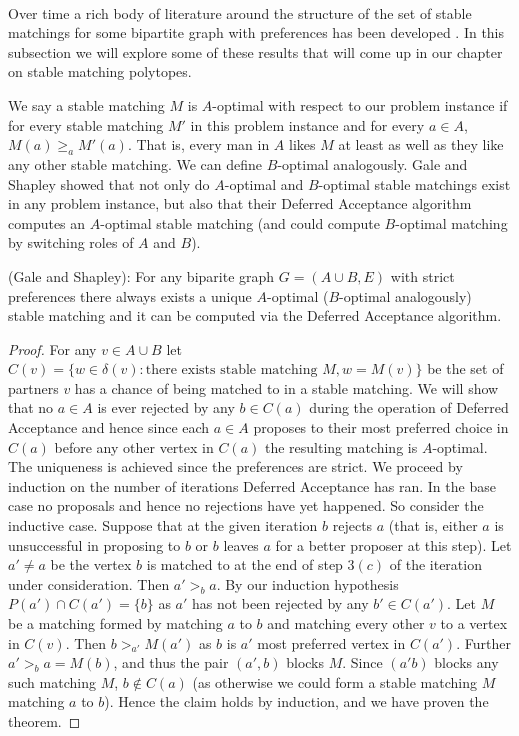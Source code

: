 \paragraph{}
Over time a rich body of literature around the structure of the set of stable matchings for some bipartite graph with preferences has been developed \cite{roth1992two}. In this subsection we will explore some of these results that will come up in our chapter on stable matching polytopes.
\begin{definition} We say a stable matching $M$ is $A$-optimal with respect to our problem instance if for every stable matching $M'$ in this problem instance and for every $a \in A$, $M(a) \geq_a M'(a)$. That is, every man in $A$ likes $M$ at least as well as they like any other stable matching. We can define $B$-optimal analogously. Gale and Shapley showed that not only do $A$-optimal and $B$-optimal stable matchings exist in any problem instance, but also that their Deferred Acceptance algorithm computes an $A$-optimal stable matching \cite{gale1962college} (and could compute $B$-optimal matching by switching roles of $A$ and $B$).
\end{definition}
\begin{theorem} (Gale and Shapley): For any biparite graph $G = (A\cup B, E)$ with strict preferences there always exists a unique $A$-optimal ($B$-optimal analogously) stable matching and it can be computed via the Deferred Acceptance algorithm.
\end{theorem}
\begin{proof}
For any $v \in A\cup B$ let $C(v) = \{w \in \delta(v) : \text{there exists stable matching } M, w = M(v) \}$ be the set of partners $v$ has a chance of being matched to in a stable matching. We will show that no $a \in A$ is ever rejected by any $b \in C(a)$ during the operation of Deferred Acceptance and hence since each $a \in A$ proposes to their most preferred choice in $C(a)$ before any other vertex in $C(a)$ the resulting matching is $A$-optimal. The uniqueness is achieved since the preferences are strict. We proceed by induction on the number of iterations Deferred Acceptance has ran. In the base case no proposals and hence no rejections have yet happened. So consider the inductive case. Suppose that at the given iteration $b$ rejects $a$ (that is, either $a$ is unsuccessful in proposing to $b$ or $b$ leaves $a$ for a better proposer at this step). Let $a' \neq a$ be the vertex $b$ is matched to at the end of step $3(c)$ of the iteration under consideration. Then $a' >_b a$. By our induction hypothesis $P(a') \cap C(a') = \{b\}$ as $a'$ has not been rejected by any $b' \in C(a')$. Let $M$ be a matching formed by matching $a$ to $b$ and matching every other $v$ to a vertex in $C(v)$. Then $b >_{a'} M(a')$ as $b$ is $a'$ most preferred vertex in $C(a')$. Further $a' >_b a=M(b)$, and thus the pair $(a',b)$ blocks $M$. Since $(a'b)$ blocks any such matching $M$, $b \not\in C(a)$ (as otherwise we could form a stable matching $M$ matching $a$ to $b$). Hence the claim holds by induction, and we have proven the theorem. \end{proof}
